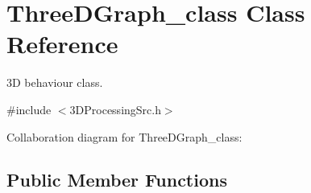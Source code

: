 \hypertarget{classThreeDGraph__class}{}\section{Three\+D\+Graph\+\_\+class Class Reference}
\label{classThreeDGraph__class}


3D behaviour class.  




{\ttfamily \#include $<$3\+D\+Processing\+Src.\+h$>$}



Collaboration diagram for Three\+D\+Graph\+\_\+class\+:
\subsection*{Public Member Functions}
